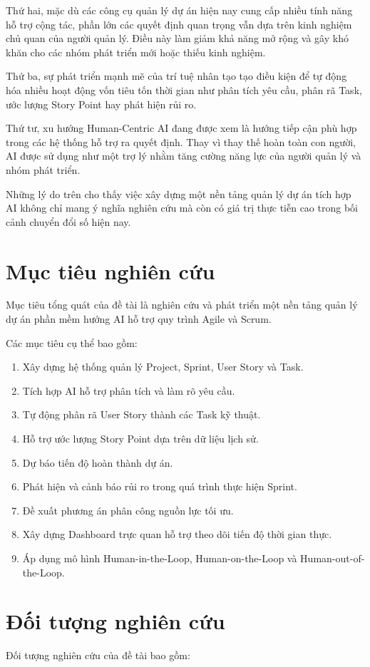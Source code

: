 \documentclass[12pt,a4paper]{report}
\begin{document}
Thứ hai, mặc dù các công cụ quản lý dự án hiện nay cung cấp nhiều tính năng hỗ trợ cộng tác, phần lớn các quyết định quan trọng vẫn dựa trên kinh nghiệm chủ quan của người quản lý. Điều này làm giảm khả năng mở rộng và gây khó khăn cho các nhóm phát triển mới hoặc thiếu kinh nghiệm.

Thứ ba, sự phát triển mạnh mẽ của trí tuệ nhân tạo tạo điều kiện để tự động hóa nhiều hoạt động vốn tiêu tốn thời gian như phân tích yêu cầu, phân rã Task, ước lượng Story Point hay phát hiện rủi ro.

Thứ tư, xu hướng Human-Centric AI đang được xem là hướng tiếp cận phù hợp trong các hệ thống hỗ trợ ra quyết định. Thay vì thay thế hoàn toàn con người, AI được sử dụng như một trợ lý nhằm tăng cường năng lực của người quản lý và nhóm phát triển.

Những lý do trên cho thấy việc xây dựng một nền tảng quản lý dự án tích hợp AI không chỉ mang ý nghĩa nghiên cứu mà còn có giá trị thực tiễn cao trong bối cảnh chuyển đổi số hiện nay.


\section{Mục tiêu nghiên cứu}
Mục tiêu tổng quát của đề tài là nghiên cứu và phát triển một nền tảng quản lý dự án phần mềm hướng AI hỗ trợ quy trình Agile và Scrum.

Các mục tiêu cụ thể bao gồm:

\begin{enumerate}
\item Xây dựng hệ thống quản lý Project, Sprint, User Story và Task.
\item Tích hợp AI hỗ trợ phân tích và làm rõ yêu cầu.
\item Tự động phân rã User Story thành các Task kỹ thuật.
\item Hỗ trợ ước lượng Story Point dựa trên dữ liệu lịch sử.
\item Dự báo tiến độ hoàn thành dự án.
\item Phát hiện và cảnh báo rủi ro trong quá trình thực hiện Sprint.
\item Đề xuất phương án phân công nguồn lực tối ưu.
\item Xây dựng Dashboard trực quan hỗ trợ theo dõi tiến độ thời gian thực.
\item Áp dụng mô hình Human-in-the-Loop, Human-on-the-Loop và Human-out-of-the-Loop.
\end{enumerate}


\section{Đối tượng nghiên cứu}
Đối tượng nghiên cứu của đề tài bao gồm:
\end{document}
